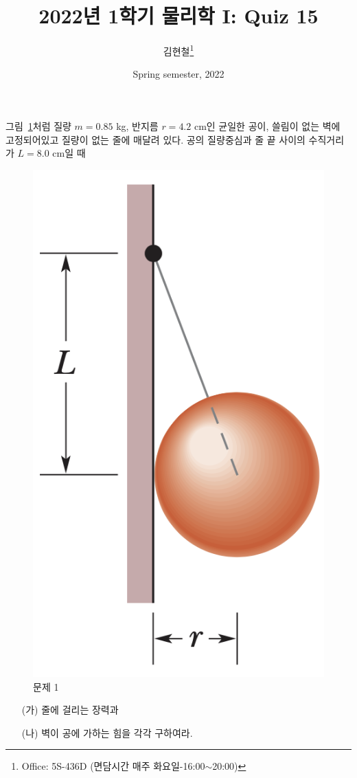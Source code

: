 \documentclass[floatfix,nofootinbib,superscriptaddress,fleqn]{revtex4-2}
\begin{document}
\title{\Large 2022년 1학기 물리학 I: Quiz 15}
\author{김현철\footnote{Office: 5S-436D (면담시간 매주
    화요일-16:00$\sim$20:00)}} 
\date{Spring semester, 2022}


\vspace{1.cm}

\maketitle


그림~\ref{fig:1}처럼 질량 $m=0.85$ kg, 반지름 $r=4.2$ cm인 균일한 공이,
쓸림이 없는 벽에 고정되어있고 질량이 없는 줄에 매달려 있다. 공의
질량중심과 줄 끝 사이의 수직거리가 $L=8.0$ cm일 때
\begin{figure}[htp]
  \centering
\includegraphics[scale=0.5]{Qfig15-1-20220502.png}
  \caption{문제 1}
  \label{fig:1}
\end{figure}
\begin{itemize}
\item[(가)] 줄에 걸리는 장력과
\item[(나)] 벽이 공에 가하는 힘을 각각 구하여라. 
\end{itemize}
\end{document}
